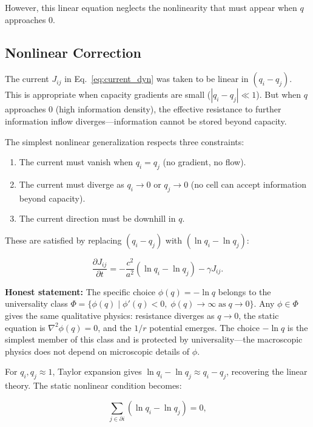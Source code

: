 \documentclass[aps,prd,twocolumn,showpacs,superscriptaddress,preprintnumbers]{revtex4-2}
\begin{document}
However, this linear equation neglects the nonlinearity that must appear when $q$ approaches 0.

\subsection{Nonlinear Correction}

The current $J_{ij}$ in Eq.~\eqref{eq:current_dyn} was taken to be linear in $(q_i-q_j)$.
This is appropriate when capacity gradients are small ($|q_i-q_j|\ll 1$).
But when $q$ approaches 0 (high information density), the effective resistance to further information inflow diverges---information cannot be stored beyond capacity.

The simplest nonlinear generalization respects three constraints:
\begin{enumerate}
    \item The current must vanish when $q_i=q_j$ (no gradient, no flow).
    \item The current must diverge as $q_i\to0$ or $q_j\to0$ (no cell can accept information beyond capacity).
    \item The current direction must be downhill in $q$.
\end{enumerate}

These are satisfied by replacing $(q_i-q_j)$ with $(\ln q_i-\ln q_j)$:

\begin{equation}
\frac{\partial J_{ij}}{\partial t} = -\frac{c^2}{a^2}(\ln q_i - \ln q_j) - \gamma J_{ij}.
\label{eq:current_nonlinear}
\end{equation}

\textbf{Honest statement:} The specific choice $\phi(q)=-\ln q$ belongs to the universality class $\Phi=\{\phi(q) \mid \phi'(q)<0,\;\phi(q)\to\infty\;\text{as}\;q\to0\}$.
Any $\phi\in\Phi$ gives the same qualitative physics: resistance diverges as $q\to0$, the static equation is $\nabla^2\phi(q)=0$, and the $1/r$ potential emerges.
The choice $-\ln q$ is the simplest member of this class and is protected by universality---the macroscopic physics does not depend on microscopic details of $\phi$.

For $q_i,q_j\approx1$, Taylor expansion gives $\ln q_i-\ln q_j\approx q_i-q_j$, recovering the linear theory.
The static nonlinear condition becomes:

\begin{equation}
\sum_{j \in \partial i} (\ln q_i - \ln q_j) = 0,
\label{eq:laplace_ln_disc}
\end{equation}
\end{document}
